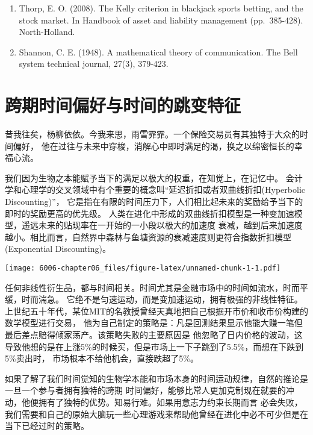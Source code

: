 \documentclass[
  oneside]{book}
\providecommand{\tightlist}{%
  \setlength{\itemsep}{0pt}\setlength{\parskip}{0pt}}
\begin{document}
\begin{enumerate}
\def\labelenumi{\arabic{enumi}.}
\tightlist
\item
  Thorp, E. O. (2008). The Kelly criterion in blackjack sports betting, and the stock market. In Handbook of asset and liability management (pp.~385-428). North-Holland.
\item
  Shannon, C. E. (1948). A mathematical theory of communication. The Bell system technical journal, 27(3), 379-423.
\end{enumerate}

\hypertarget{ux8de8ux671fux65f6ux95f4ux504fux597dux4e0eux65f6ux95f4ux7684ux8df3ux53d8ux7279ux5f81}{%
\chapter{跨期时间偏好与时间的跳变特征}\label{ux8de8ux671fux65f6ux95f4ux504fux597dux4e0eux65f6ux95f4ux7684ux8df3ux53d8ux7279ux5f81}}

昔我往矣，杨柳依依。今我来思，雨雪霏霏。一个保险交易员有其独特于大众的时间偏好，
他在过往与未来中穿梭，消解心中即时满足的渴，换之以绵密恒长的幸福心流。

我们因为生物之本能赋予当下的满足以极大的权重，在知觉上，在记忆中。
会计学和心理学的交叉领域中有个重要的概念叫``延迟折扣或者双曲线折扣(Hyperbolic Discounting)''，
它是指在有限的时间压力下，人们相比起未来的奖励给予当下的即时的奖励更高的优先级。
人类在进化中形成的双曲线折扣模型是一种变加速模型，遥远未来的贴现率在一开始的一小段以极大的加速度
衰减，越到后来加速度越小。相比而言，自然界中森林与鱼塘资源的衰减速度则更符合指数折扣模型(Exponential
Discounting)。

\texttt{[image: 6006-chapter06\_files/figure-latex/unnamed-chunk-1-1.pdf]}

任何非线性衍生品，都与时间相关。时间尤其是金融市场中的时间如流水，时而平缓，时而湍急。
它绝不是匀速运动，而是变加速运动，拥有极强的非线性特征。上世纪五十年代，某位MIT的名教授曾经天真地把自己根据开市价和收市价构建的数学模型进行交易，
他为自己制定的策略是：凡是回测结果显示他能大赚一笔但最后差点赔得倾家荡产。该策略失败的主要原因是
他忽略了日内价格的波动，这导致他想的是在上涨5\%的时候买，但是市场上一下子跳到了5.5\%，而想在下跌到5\%卖出时，
市场根本不给他机会，直接跌超了5\%。

如果了解了我们时间觉知的生物学本能和市场本身的时间运动规律，自然的推论是一旦一个参与者拥有独特的跨期
时间偏好，能够比常人更加克制现在就要的冲动，他便拥有了独特的优势。知易行难。如果用意志力约束长期而言
必会失败，我们需要和自己的原始大脑玩一些心理游戏来帮助他曾经在进化中必不可少但是在当下已经过时的策略。
\end{document}
